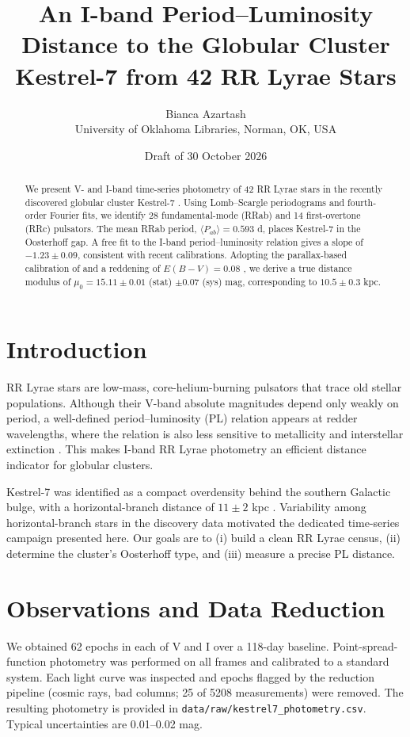 \documentclass[11pt]{article}
\title{An I-band Period--Luminosity Distance to the Globular Cluster Kestrel-7 from 42 RR Lyrae Stars}
\author{Bianca Azartash\\ \small University of Oklahoma Libraries, Norman, OK, USA}
\date{Draft of 30 October 2026}
\begin{document}
\maketitle
\begin{center}\end{center}
\begin{abstract}
We present V- and I-band time-series photometry of 42 RR Lyrae stars in the recently discovered globular cluster Kestrel-7 \citep{haddad2021}. Using Lomb--Scargle periodograms and fourth-order Fourier fits, we identify 28 fundamental-mode (RRab) and 14 first-overtone (RRc) pulsators. The mean RRab period, $\langle P_{ab}\rangle = 0.593$ d, places Kestrel-7 in the Oosterhoff gap. A free fit to the I-band period--luminosity relation gives a slope of $-1.23 \pm 0.09$, consistent with recent calibrations. Adopting the parallax-based calibration of \citet{okafor2023} and a reddening of $E(B-V) = 0.08$ \citep{chen2024}, we derive a true distance modulus of $\mu_0 = 15.11 \pm 0.01$ (stat) $\pm 0.07$ (sys) mag, corresponding to $10.5 \pm 0.3$ kpc.
\end{abstract}

\section{Introduction}
RR Lyrae stars are low-mass, core-helium-burning pulsators that trace old stellar populations. Although their V-band absolute magnitudes depend only weakly on period, a well-defined period--luminosity (PL) relation appears at redder wavelengths, where the relation is also less sensitive to metallicity and interstellar extinction \citep{okafor2023}. This makes I-band RR Lyrae photometry an efficient distance indicator for globular clusters.

Kestrel-7 was identified as a compact overdensity behind the southern Galactic bulge, with a horizontal-branch distance of $11 \pm 2$ kpc \citep{haddad2021}. Variability among horizontal-branch stars in the discovery data motivated the dedicated time-series campaign presented here. Our goals are to (i) build a clean RR Lyrae census, (ii) determine the cluster's Oosterhoff type, and (iii) measure a precise PL distance.


\section{Observations and Data Reduction}
We obtained 62 epochs in each of V and I over a 118-day baseline. Point-spread-function photometry was performed on all frames and calibrated to a standard system. Each light curve was inspected and epochs flagged by the reduction pipeline (cosmic rays, bad columns; 25 of 5208 measurements) were removed. The resulting photometry is provided in \texttt{data/raw/kestrel7\_photometry.csv}. Typical uncertainties are 0.01--0.02 mag.
\end{document}
